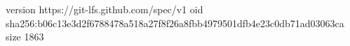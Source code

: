 version https://git-lfs.github.com/spec/v1
oid sha256:b06c13e3d2f6788478a518a27f8f26a8fbb4979501dfb4e23c0db71ad03063ca
size 1863
